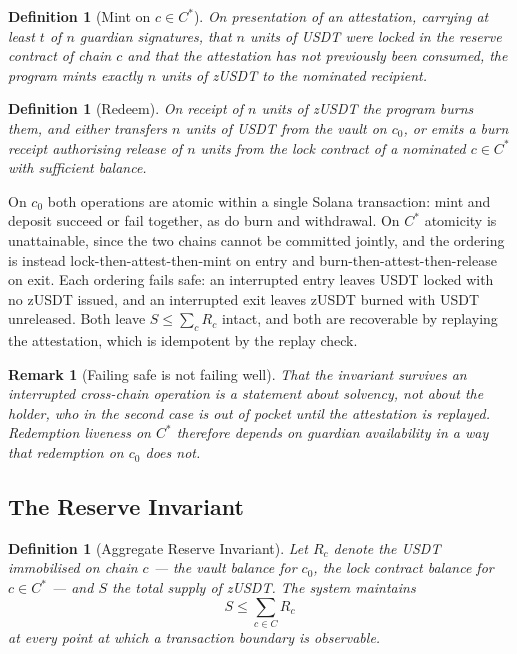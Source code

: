 \documentclass[11pt,a4paper]{article}
\newtheorem{definition}[theorem]{Definition}
\newtheorem{remark}[theorem]{Remark}
\begin{document}
\begin{definition}[Mint on $c \in C^{*}$]
On presentation of an attestation, carrying at least $t$ of $n$ guardian signatures, that $n$ units of USDT were locked in the reserve contract of chain $c$ and that the attestation has not previously been consumed, the program mints exactly $n$ units of zUSDT to the nominated recipient.
\end{definition}

\begin{definition}[Redeem]
On receipt of $n$ units of zUSDT the program burns them, and either transfers $n$ units of USDT from the vault on $c_0$, or emits a burn receipt authorising release of $n$ units from the lock contract of a nominated $c \in C^{*}$ with sufficient balance.
\end{definition}

On $c_0$ both operations are atomic within a single Solana transaction: mint and deposit succeed or fail together, as do burn and withdrawal. On $C^{*}$ atomicity is unattainable, since the two chains cannot be committed jointly, and the ordering is instead lock-then-attest-then-mint on entry and burn-then-attest-then-release on exit. Each ordering fails safe: an interrupted entry leaves USDT locked with no zUSDT issued, and an interrupted exit leaves zUSDT burned with USDT unreleased. Both leave $S \leq \sum_c R_c$ intact, and both are recoverable by replaying the attestation, which is idempotent by the replay check.

\begin{remark}[Failing safe is not failing well]
That the invariant survives an interrupted cross-chain operation is a statement about solvency, not about the holder, who in the second case is out of pocket until the attestation is replayed. Redemption liveness on $C^{*}$ therefore depends on guardian availability in a way that redemption on $c_0$ does not.
\end{remark}

\subsection{The Reserve Invariant}

\begin{definition}[Aggregate Reserve Invariant]
Let $R_c$ denote the USDT immobilised on chain $c$ --- the vault balance for $c_0$, the lock contract balance for $c \in C^{*}$ --- and $S$ the total supply of zUSDT. The system maintains
\begin{equation}
S \leq \sum_{c \in C} R_c
\end{equation}
at every point at which a transaction boundary is observable.
\end{definition}
\end{document}
